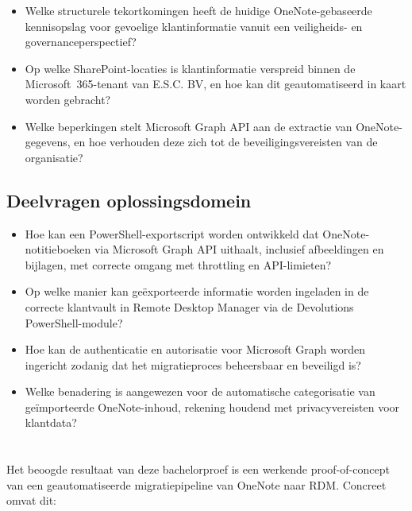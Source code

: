 \begin{itemize}
  \item Welke structurele tekortkomingen heeft de huidige OneNote-gebaseerde kennisopslag voor gevoelige klantinformatie vanuit een veiligheids- en governanceperspectief?
  \item Op welke SharePoint-locaties is klantinformatie verspreid binnen de Microsoft~365-tenant van E.S.C. BV, en hoe kan dit geautomatiseerd in kaart worden gebracht?
  \item Welke beperkingen stelt Microsoft Graph API aan de extractie van OneNote-gegevens, en hoe verhouden deze zich tot de beveiligingsvereisten van de organisatie?
\end{itemize}

\subsection{Deelvragen oplossingsdomein}

\begin{itemize}
  \item Hoe kan een PowerShell-exportscript worden ontwikkeld dat OneNote-notitieboeken via Microsoft Graph API uithaalt, inclusief afbeeldingen en bijlagen, met correcte omgang met throttling en API-limieten?
  \item Op welke manier kan geëxporteerde informatie worden ingeladen in de correcte klantvault in Remote Desktop Manager via de Devolutions PowerShell-module?
  \item Hoe kan de authenticatie en autorisatie voor Microsoft Graph worden ingericht zodanig dat het migratieproces beheersbaar en beveiligd is?
  \item Welke benadering is aangewezen voor de automatische categorisatie van geïmporteerde OneNote-inhoud, rekening houdend met privacyvereisten voor klantdata?
\end{itemize}

\section{}%
\label{sec:onderzoeksdoelstelling}

Het beoogde resultaat van deze bachelorproef is een werkende proof-of-concept van een geautomatiseerde migratiepipeline van OneNote naar RDM. Concreet omvat dit:

